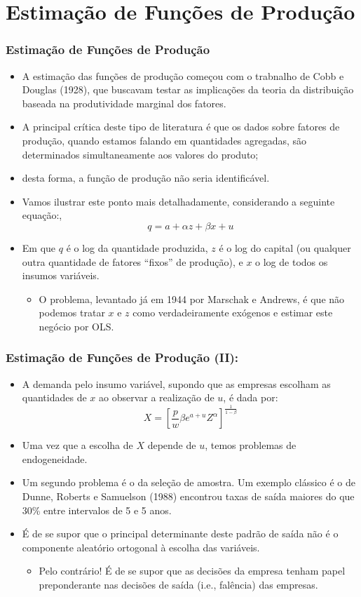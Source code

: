 \documentclass{beamer}
\begin{document}
\section{Estimação de Funções de Produção}
\begin{frame}\frametitle{Estimação de Funções de Produção}

\begin{itemize}
\item A estimação das funções de produção começou com o trabnalho de Cobb
e Douglas (1928), que buscavam testar as implicações da teoria da
distribuição baseada na produtividade marginal dos fatores.
\item A principal crítica deste tipo de literatura é que os dados sobre
fatores de produção, quando estamos falando em quantidades agregadas,
são determinados simultaneamente aos valores do produto; 
\item desta forma, a função de produção não seria identificável. 
\item Vamos ilustrar este ponto mais detalhadamente, considerando a seguinte
equação:,
\[
q=a+\alpha z+\beta x+u
\]
\item Em que $q$ é o log da quantidade produzida, $z$ é o log do capital
(ou qualquer outra quantidade de fatores ``fixos'' de produção),
e $x$ o log de todos os insumos variáveis. 

\begin{itemize}
\item O problema, levantado já em 1944 por Marschak e Andrews, é que não
podemos tratar $x$ e $z$ como verdadeiramente exógenos e estimar
este negócio por OLS. 
\end{itemize}
\end{itemize}
\end{frame}

\begin{frame}\frametitle{Estimação de Funções de Produção (II):}
\small
\begin{itemize}
\item A demanda pelo insumo variável, supondo que as empresas escolham as
quantidades de $x$ ao observar a realização de $u$, é dada por:
\[
X=\left[\frac{p}{w}\beta e^{a+u}Z^{\alpha}\right]^{\frac{1}{1-\beta}}
\]
\item Uma vez que a escolha de $X$ depende de $u$, temos problemas de
endogeneidade.
\item Um segundo problema é o da seleção de amostra. Um exemplo clássico
é o de Dunne, Roberts e Samuelson (1988) encontrou taxas de saída
maiores do que 30\% entre intervalos de 5 e 5 anos.
\item É de se supor que o principal determinante deste padrão de saída não
é o componente aleatório ortogonal à escolha das variáveis.

\begin{itemize}
\item Pelo contrário! É de se supor que as decisões da empresa tenham papel
preponderante nas decisões de saída (i.e., falência) das empresas.
\end{itemize}
\end{itemize}
\end{frame}
\end{document}
